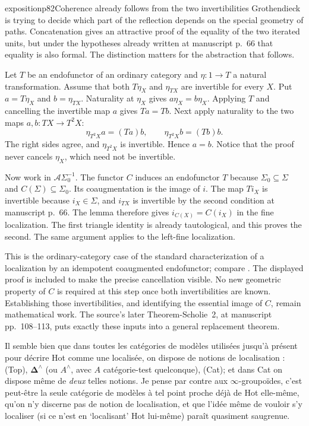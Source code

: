 \begin{dcomment}{exposition}{p82}{Coherence already follows from the two invertibilities}
Grothendieck is trying to decide which part of the reflection depends on the special geometry of paths. Concatenation gives an attractive proof of the equality of the two iterated units, but under the hypotheses already written at manuscript p.~66 that equality is also formal. The distinction matters for the abstraction that follows.

Let $T$ be an endofunctor of an ordinary category and $\eta:1\to T$ a natural transformation. Assume that both $T\eta_X$ and $\eta_{TX}$ are invertible for every $X$. Put $a=T\eta_X$ and $b=\eta_{TX}$. Naturality at $\eta_X$ gives $a\eta_X=b\eta_X$. Applying $T$ and cancelling the invertible map $a$ gives $Ta=Tb$. Next apply naturality to the two maps $a,b:TX\to T^2X$:
\[
 \eta_{T^2X}a=(Ta)b,
 \qquad \eta_{T^2X}b=(Tb)b.
\]
The right sides agree, and $\eta_{T^2X}$ is invertible. Hence $a=b$. Notice that the proof never cancels $\eta_X$, which need not be invertible.

Now work in $\mathcal A\Sigma_0^{-1}$. The functor $C$ induces an endofunctor $T$ because $\Sigma_0\subseteq\Sigma$ and $C(\Sigma)\subseteq\Sigma_0$. Its coaugmentation is the image of $i$. The map $Ti_X$ is invertible because $i_X\in\Sigma$, and $i_{TX}$ is invertible by the second condition at manuscript p.~66. The lemma therefore gives $i_{C(X)}=C(i_X)$ in the fine localization. The first triangle identity is already tautological, and this proves the second. The same argument applies to the left-fine localization.

This is the ordinary-category case of the standard characterization of a localization by an idempotent coaugmented endofunctor; compare \citet[Proposition~5.2.7.4]{Lurie2009HTT}. The displayed proof is included to make the precise cancellation visible. No new geometric property of $C$ is required at this step once both invertibilities are known. Establishing those invertibilities, and identifying the essential image of $C$, remain mathematical work. The source's later Theorem-Scholie~2, at manuscript pp.~108--113, puts exactly these inputs into a general replacement theorem.
\end{dcomment}


Il semble bien que dans toutes les catégories de modèles utilisées jusqu’à présent pour décrire Hot comme une localisée, on dispose de notions de localisation : (Top), $\mathbf{\Delta}^\wedge$ (ou $A^\wedge$, avec $A$ catégorie-test quelconque), (Cat); et dans Cat on dispose même de \textit{deux} telles notions. Je pense par contre aux $\infty$-groupoïdes, c’est peut-être la seule catégorie de modèles à tel point proche déjà de Hot elle-même, qu’on n’y discerne pas de notion de localisation, et que l’idée même de vouloir s’y localiser (si ce n’est en ‘localisant’ Hot lui-même) paraît quasiment
saugrenue.

